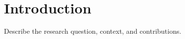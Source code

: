 \section{Introduction}
\label{sec:introduction}

Describe the research question, context, and contributions.
